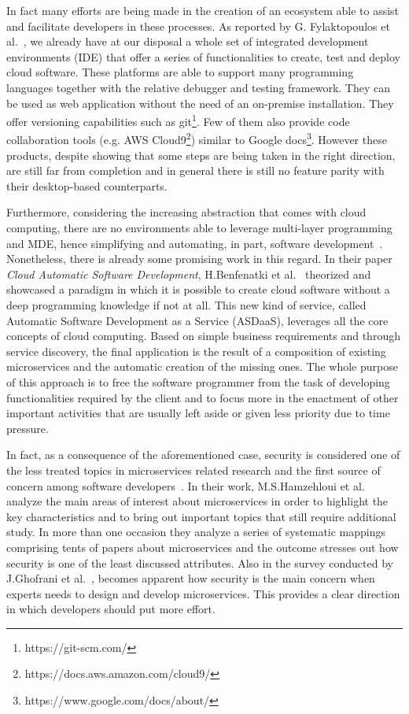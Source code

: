 \documentclass[a4paper, 10pt, conference]{ieeeconf}
\begin{document}
In fact many efforts are being made in the creation of an ecosystem able to assist and facilitate developers in these processes. As reported by G. Fylaktopoulos et al.~\cite{overview-platforms}, we already have at our disposal a whole set of integrated development environments (IDE) that offer a series of functionalities to create, test and deploy cloud software.  These platforms are able to support many programming languages together with the relative debugger and testing framework. They can be used as web application without the need of an on-premise installation. They offer versioning capabilities such as git\footnote{https://git-scm.com/}. Few of them also provide code collaboration tools (e.g. AWS Cloud9\footnote{https://docs.aws.amazon.com/cloud9/}) similar to Google docs\footnote{https://www.google.com/docs/about/}. However these products, despite showing that some steps are being taken in the right direction, are still far from completion and in general there is still no feature parity with their desktop-based counterparts.

Furthermore, considering the increasing abstraction that comes with cloud computing, there are no environments able to leverage multi-layer
programming and MDE, hence simplifying and automating, in part, software development~\cite{overview-platforms}. Nonetheless, there is already some promising work in this regard. In their paper \textit{Cloud Automatic Software Development}, H.Benfenatki et al.~\cite{automatic-dev} theorized and showcased a paradigm in which it is possible to create cloud software without a deep programming knowledge if not at all. This new kind of service, called Automatic Software Development as a Service (ASDaaS), leverages all the core concepts of cloud computing. Based on simple business requirements and through service discovery, the final application is the result of a composition of existing microservices and the automatic creation of the missing ones. The whole purpose of this approach is to free the software programmer from the task of developing functionalities required by the client and to focus more in the enactment of other important activities that are usually left aside or given less priority due to time pressure.

In fact, as a consequence of the aforementioned case, security is considered one of the less treated topics in microservices related research and the first source of concern among software developers~\cite{research-mss, challenges-mss}. In their work, M.S.Hamzehloui et al.~\cite{research-mss} analyze the main areas of interest about microservices in order to highlight the key characteristics and to bring out important topics that still require additional study. In more than one occasion they analyze a series of systematic mappings comprising tents of papers about microservices and the outcome stresses out how security is one of the least discussed attributes. Also in the survey conducted by J.Ghofrani et al.~\cite{challenges-mss}, becomes apparent how security is the main concern when experts needs to design and develop microservices. This provides a clear direction in which developers should put more effort.
\end{document}
